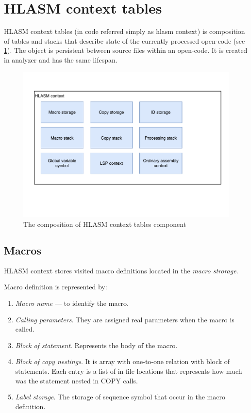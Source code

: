 \section{HLASM context tables}

HLASM context tables (in code referred simply as hlasm context) is composition of tables and stacks that describe state of the currently processed open-code (see \cref{fig06:hlasm}). The object is persistent between source files within an open-code. It is created in analyzer and has the same lifespan. 

\begin{figure}
	\centering
	\includegraphics[width=\textwidth / 2]{img/hlasm_arch}
	\caption{The composition of HLASM context tables component}
	\label{fig06:hlasm}
\end{figure}

\subsection{Macros}

HLASM context stores visited macro definitions located in the \emph{macro strorage}. 

Macro definition is represented by:
\begin{enumerate}
	\item \emph{Macro name} --- to identify the macro.
	\item \emph{Calling parameters}. They are assigned real parameters when the macro is called.
	\item \emph{Block of statement}. Represents the body of the macro.
	\item \emph{Block of copy nestings}. It is array with one-to-one relation with block of statements. Each entry is a list of in-file locations that represents how much was the statement nested in COPY calls.
	\item \emph{Label storage}. The storage of sequence symbol that occur in the macro definition.
\end{enumerate}

